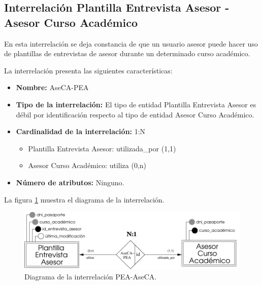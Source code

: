 \subsection{Interrelación Plantilla Entrevista Asesor - Asesor Curso Académico}

   \begin{description}
      \item[Definición] En esta interrelación se deja constancia de que un
      usuario asesor puede hacer uso de plantillas de entrevistas de asesor
      durante un determinado curso académico.

      \item[Características] La interrelación presenta las siguientes
                             características:

         \begin{itemize}
            \item \textbf{Nombre:} AseCA-PEA
            \item \textbf{Tipo de la interrelación:} El tipo de entidad
            Plantilla Entrevista Asesor es débil por identificación respecto al
            tipo de entidad Asesor Curso Académico.
            \item \textbf{Cardinalidad de la interrelación:} 1:N
                  \begin{itemize}
                     \item Plantilla Entrevista Asesor: utilizada\_por (1,1)
                     \item Asesor Curso Académico: utiliza (0,n)
                  \end{itemize}
            \item \textbf{Número de atributos:} Ninguno.
         \end{itemize}

      \item[Diagrama] La figura \ref{diagramaPEA-AseCA} muestra el diagrama de
      la interrelación.

      \item \begin{figure}[!ht]
            \begin{center}
            \includegraphics[]{07.Modelo_Entidad-Interrelacion/7.3.Analisis_Interrelaciones/diagramas/PEA-AseCA.pdf}
            \caption{Diagrama de la interrelación PEA-AseCA.}
            \label{diagramaPEA-AseCA}
            \end{center}
         \end{figure}


\end{description}
